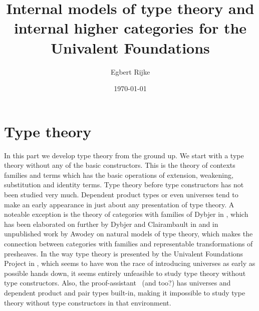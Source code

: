\documentclass{article}
\title{Internal models of type theory and internal higher categories for the
Univalent Foundations}
\author{Egbert Rijke}
\date{\today}
\begin{document}
\maketitle

\begin{comment}
\begin{abstract}
A project is proposed where we investigate notions of internal models of type
theory and internal higher categories. We take the point of view that an
internal model is an internal higher category with extra structure interpreting
the type constructors. We propose to (1) explore possible definitions of both
notions, (2) find a zoo of examples and (3) find extensions of the underlying
theory and models thereof to include higher inductive types.
\end{abstract}
\end{comment}

\tableofcontents

\begin{comment}
\part{Introduction}
The project proposal is described in \autoref{stage1} and \autoref{stage2}. In
the appendices we give elaborations on the topics discussed in the proposal itself.
By including these we intend to clarify the proposal and present some of the 
(unfinished) work that is already done.





%
\end{comment}

\part{Type theory}

In this part we develop type theory from the ground up. We start with a type
theory without any of the basic constructors. This is the theory of contexts
families and terms which has the basic operations of extension, weakening,
substitution and identity terms. Type theory before type constructors has not
been studied very much. Dependent product types or even universes tend to make
an early appearance in just about any presentation of type theory.
A noteable exception is the theory of categories with families of Dybjer
in \cite{Dybjer1996}, which has been elaborated on further by Dybjer and
Clairambault in \cite{DybjerClairambault2011} and in unpublished work by
Awodey \cite{Awodey2013} on natural models of type theory,
which makes the connection between categories with families and representable
transformations of presheaves. In the way type theory is presented by the
Univalent Foundations Project in \cite{TheBook}, which seems to have won the race of introducing universes
as early as possible hands down, it seems entirely unfeasible to study type
theory without type constructors. Also, the 
proof-assistant \Coq\ {\color{red}(and \Agda too?)} has universes and dependent product and pair types 
built-in, making it impossible to study type theory without type constructors in 
that environment.
\end{document}
